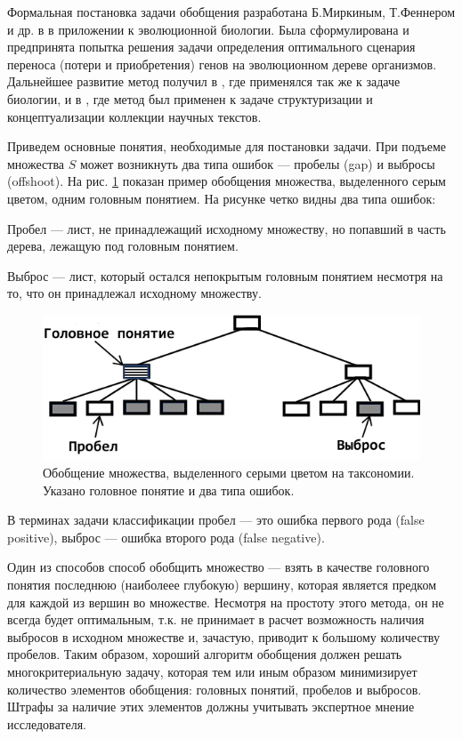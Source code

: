 \documentclass[12pt]{article}
\newenvironment{itemize*}%
{\begin{itemize}%
	\setlength{\itemsep}{0pt}%
	\setlength{\parskip}{0pt}}%
{\end{itemize}}
\begin{document}
Формальная постановка задачи обобщения разработана Б.Миркиным, Т.Феннером и др. в \cite{mirkin2003algorithms} в приложении к эволюционной биологии. Была сформулирована и предпринята попытка решения задачи определения оптимального сценария переноса (потери и приобретения) генов на эволюционном дереве организмов. Дальнейшее развитие метод получил в \cite{mirkin2006aggregating}, где применялся так же к задаче биологии, и в \cite{mirkin2018preprint}, где метод был применен к задаче структуризации и концептуализации коллекции научных текстов.

Приведем основные понятия, необходимые для постановки задачи. При подъеме множества $S$ может возникнуть два типа ошибок --- пробелы (gap) и выбросы (offshoot). На рис. \ref{fig:gap_offshoot_example} показан пример обобщения множества, выделенного серым цветом, одним головным понятием. На рисунке четко видны два типа ошибок:
\begin{itemize*}
	\item Пробел ---  лист, не принадлежащий исходному множеству, но попавший в часть дерева, лежащую под головным понятием.
	\item Выброс --- лист, который остался непокрытым головным понятием несмотря на то, что он принадлежал исходному множеству. 
\end{itemize*} 

\begin{figure}
\centering
\includegraphics[width=0.5\linewidth]{images/gap_offshoot_example}
\caption{Обобщение множества, выделенного серыми цветом на таксономии. Указано головное понятие и два типа ошибок.}
\label{fig:gap_offshoot_example}
\end{figure}

В терминах задачи классификации пробел --- это  ошибка первого рода (false positive), выброс --- ошибка второго рода (false negative). 

Один из способов способ обобщить множество --- взять в качестве головного понятия последнюю (наиболеее глубокую) вершину, которая является предком для каждой из вершин во множестве. Несмотря на простоту этого метода, он не всегда будет оптимальным, т.к. не принимает в расчет возможность наличия выбросов в исходном множестве и, зачастую, приводит к большому количеству пробелов. Таким образом, хороший алгоритм обобщения должен решать многокритериальную задачу, которая тем или иным образом минимизирует количество элементов обобщения: головных понятий, пробелов и выбросов. Штрафы за наличие этих элементов должны учитывать экспертное мнение исследователя. 
\end{document}
